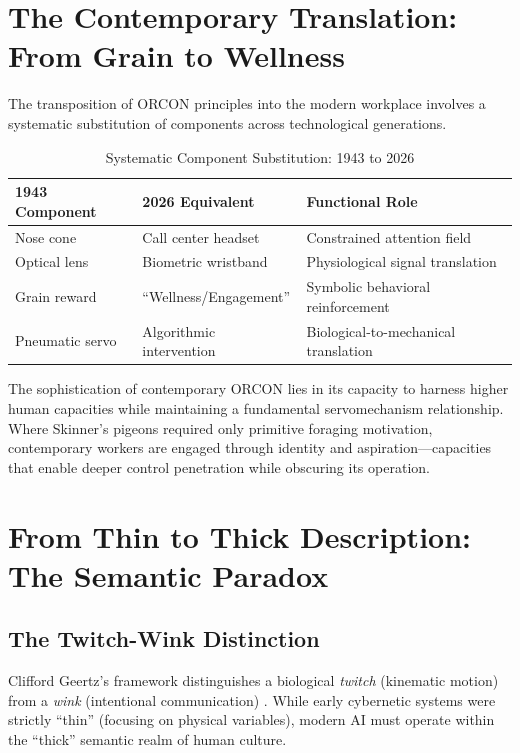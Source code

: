 \documentclass[11pt, a4paper]{article}
\begin{document}
\section{The Contemporary Translation: From Grain to Wellness}

The transposition of ORCON principles into the modern workplace involves a systematic substitution of components across technological generations.

\begin{table}[h]
\centering
\caption{Systematic Component Substitution: 1943 to 2026}
\label{tab:substitution}
\begin{tabular}{@{}lll@{}}
\toprule
\textbf{1943 Component} & \textbf{2026 Equivalent} & \textbf{Functional Role} \\ \midrule
Nose cone & Call center headset & Constrained attention field \\
Optical lens & Biometric wristband & Physiological signal translation \\
Grain reward & ``Wellness/Engagement'' & Symbolic behavioral reinforcement \\
Pneumatic servo & Algorithmic intervention & Biological-to-mechanical translation \\ \bottomrule
\end{tabular}
\end{table}

The sophistication of contemporary ORCON lies in its capacity to harness higher human capacities while maintaining a fundamental servomechanism relationship. Where Skinner's pigeons required only primitive foraging motivation, contemporary workers are engaged through identity and aspiration—capacities that enable deeper control penetration while obscuring its operation.

\section{From Thin to Thick Description: The Semantic Paradox}

\subsection{The Twitch-Wink Distinction}
Clifford Geertz’s framework distinguishes a biological \textit{twitch} (kinematic motion) from a \textit{wink} (intentional communication) \cite{geertz1973interpretation}. While early cybernetic systems were strictly ``thin'' (focusing on physical variables), modern AI must operate within the ``thick'' semantic realm of human culture.
\end{document}
